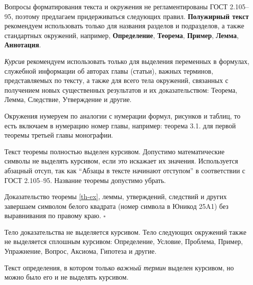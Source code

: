 \begin{refsection}
Вопросы форматирования текста и окружения не регламентированы ГОСТ 2.105--95, поэтому предлагаем придерживаться следующих правил.
\textbf{Полужирный текст} рекомендуем использовать только для названия разделов и подразделов, а также стандартных окружений, например, \textbf{Определение}, \textbf{Теорема}, \textbf{Пример}, \textbf{Лемма}, \textbf{Аннотация}.


\textit{Курсив} рекомендуем использовать только для выделения переменных в формулах, служебной информации об авторах главы (статьи), важных терминов, представляемых по тексту, а также для всего тела окружений, связанных с получением новых существенных результатов и их доказательством: Теорема, Лемма, Следствие, Утверждение и другие.

Окружения нумеруем по аналогии с нумерации формул, рисунков и таблиц, то есть включаем в нумерацию номер главы, например:
теорема 3.1. для первой теоремы третьей главы монографии.  



\begin{thm}[о неполноте] %
	\label{th-ex} 
	Текст теоремы полностью выделен курсивом. Допустимо математические символы не выделять курсивом, если это искажает их значения. Используется абзацный отсуп, так как ``Абзацы в тексте начинают отступом'' в соответствии с ГОСТ 2.105--95. Название теоремы допустимо убрать.
\end{thm}
Доказательство теоремы \ref{th-ex}, леммы, утверждений, следствий и других завершаем символом белого квадрата (номер символа в Юникод 25A1) без выравнивания по правому краю. $\square$

Тело доказательства не выделяется курсивом.
Тело следующих окружений также не выделяется сплошным курсивом: Определение, Условие, Проблема, Пример, Упражнение, Вопрос, Аксиома, Гипотеза и другие.

\begin{defn}[хороший и-тест] %
	\label{def-ex}
	Текст определения, в котором только {\itshape важный термин} выделен курсивом, но можно было его и не выделять курсивом.
\end{defn}



\end{refsection}
